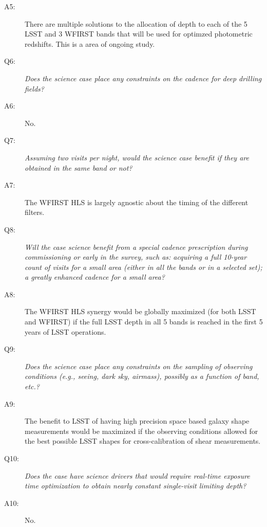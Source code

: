 \begin{description}
\item[A5:] There are multiple solutions to the allocation of depth to each of the 5 LSST and 3 WFIRST bands that will be used for optimzed photometric redshifts. This is a area of ongoing study.

\item[Q6:] {\it Does the science case place any constraints on the
cadence for deep drilling fields?}

\item[A6:] No.

\item[Q7:] {\it Assuming two visits per night, would the science case
benefit if they are obtained in the same band or not?}

\item[A7:] The WFIRST HLS is largely agnostic about the timing of the different filters.

\item[Q8:] {\it Will the case science benefit from a special cadence
prescription during commissioning or early in the survey, such as:
acquiring a full 10-year count of visits for a small area (either in all
the bands or in a  selected set); a greatly enhanced cadence for a small
area?}

\item[A8:] The WFIRST HLS synergy would be globally maximized (for both
LSST and WFIRST) if the full LSST depth in all 5 bands is reached in the
first 5 years of LSST operations.

\item[Q9:] {\it Does the science case place any constraints on the
sampling of observing conditions (e.g., seeing, dark sky, airmass),
possibly as a function of band, etc.?}

\item[A9:] The benefit to LSST of having high precision space based
galaxy shape measurements would be maximized if the observing conditions
allowed for the best possible LSST shapes for cross-calibration of shear
measurements.

\item[Q10:] {\it Does the case have science drivers that would require
real-time exposure time optimization to obtain nearly constant
single-visit limiting depth?}

\item[A10:] No.

\end{description}


\navigationbar

